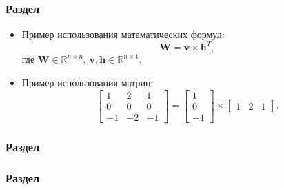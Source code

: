 \begin{frame}
\frametitle{Раздел }

\begin{itemize}
    \item Пример использования математических формул:
  \[
  \mathbf{W} = \mathbf{v} \times \mathbf{h}^{T},
  \]
  где $\mathbf{W} \in \mathbb{R}^{n \times n}$, $\mathbf{v}, \mathbf{h} \in \mathbb{R}^{n \times 1}$.
  
    \item Пример использования матриц:
  \[
  \begin{bmatrix}
  1 & 2 & 1 \\
  0 & 0 & 0 \\
  -1 & -2 & -1
  \end{bmatrix}
  =
  \begin{bmatrix}
  1 \\
  0 \\
  -1
  \end{bmatrix}
  \times
  \begin{bmatrix}
  1 & 2 & 1
  \end{bmatrix}.
  \]
  \end{itemize}
\end{frame}
\begin{frame}[t]
    \frametitle{Раздел }
    
\end{frame}
\begin{frame}[t]
    \begin{block}{\centering}
        \centering
    \end{block}
\end{frame}
\begin{frame}[t]
    \frametitle{Раздел}
    \begin{block}{\centering}
        \vspace{1mm}
        \centering
    \end{block}

\end{frame}


